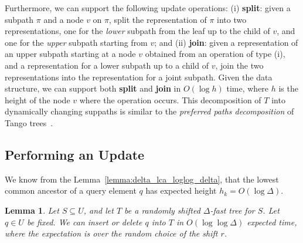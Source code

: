 \documentclass[a4paper,11pt]{article}
\newtheorem{lemma}[theorem]{Lemma}
\newcommand{\?}{\mskip1.5mu}
\begin{document}
Furthermore, we can support the following update operations:
(i) \textbf{split}: given a subpath $\pi$ and a node $v$ on $\pi$, split 
the representation of $\pi$ into two representations, one for the 
\emph{lower} subpath from the leaf up to the child of $v$, and
one for the \emph{upper} subpath starting from $v$; and (ii) 
\textbf{join}: given a
representation of an upper subpath starting at a node $v$ obtained 
from an operation of type (i), and a representation for 
a lower subpath up to a child of $v$, join the two representations
into the representation for a joint subpath.
Given the data structure, we can support
both \textbf{split} and \textbf{join} in
 $O(\log h)$ time, where $h$ is the height of 
the node $v$ where the operation occurs. 
This decomposition of $T$ into dynamically changing suppaths
is similar to the \emph{preferred paths decomposition} of
Tango trees~\cite{DemaineHaIaPa07}.

\subsection{Performing an Update}

We know from the Lemma~\ref{lemma:delta_lca_loglog_delta}, that 
the lowest common ancestor of a query element $q$ has expected 
height $h_k = O(\log \Delta)$.

\begin{lemma}
\label{lemma:delta_insert}
Let $S \subseteq U$, and let $T$ be
a randomly shifted $\Delta$-fast tree for 
$S$.  Let $q \in U$ be fixed.
We can insert or delete $q$ into $T$
in $O(\log \log \Delta)$ expected time, where the expectation is 
over the random choice of the shift $r$.
\end{lemma}
\end{document}
